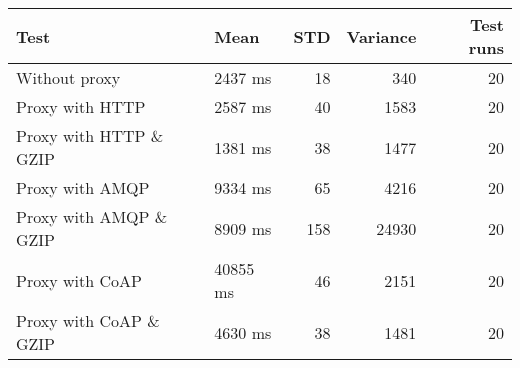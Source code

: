 \begin{tabularx}{\textwidth}{llrrr}
\hline
 Test                   & Mean     &   STD &   Variance &   Test runs \\
\hline
 Without proxy          & 2437 ms  &    18 &        340 &          20 \\
 Proxy with HTTP        & 2587 ms  &    40 &       1583 &          20 \\
 Proxy with HTTP \& GZIP & 1381 ms  &    38 &       1477 &          20 \\
 Proxy with AMQP        & 9334 ms  &    65 &       4216 &          20 \\
 Proxy with AMQP \& GZIP & 8909 ms  &   158 &      24930 &          20 \\
 Proxy with CoAP        & 40855 ms &    46 &       2151 &          20 \\
 Proxy with CoAP \& GZIP & 4630 ms  &    38 &       1481 &          20 \\
\hline
\end{tabularx}
